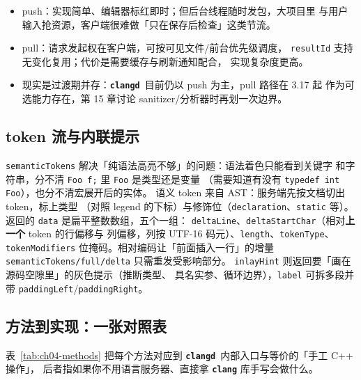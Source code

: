 \documentclass[12pt,a4paper,fontset=fandol]{ctexbook}
\newcommand{\Bk}{\discretionary{}{}{}}
\newcommand{\Lib}[1]{\textbf{\texttt{#1}}}
\newcommand{\Lang}[1]{\textsf{#1}}
\newcommand{\CPP}{\Lang{C++}}
\newcommand{\CD}{\Lib{clangd}}
\begin{document}
\begin{compare}[title={push 与 pull 诊断的取舍}]
\begin{itemize}
  \item push：实现简单、编辑器标红即时；但后台线程随时发包，大项目里
        与用户输入抢资源，客户端很难做「只在保存后检查」这类节流。
  \item pull：请求发起权在客户端，可按可见文件/前台优先级调度，
        \texttt{resultId} 支持无变化复用；代价是需要缓存与刷新通知配合，
        实现复杂度更高。
  \item 现实是过渡期并存：\CD\ 目前仍以 push 为主，pull 路径在 3.17 起
        作为可选能力存在，第 15 章讨论 sanitizer/分析器时再划一次边界。
\end{itemize}
\end{compare}

\subsection{token 流与内联提示}
\texttt{semanticTokens} 解决「纯语法高亮不够」的问题：语法着色只能看到关键字
和字符串，分不清 \texttt{Foo f;} 里 \texttt{Foo} 是类型还是变量
（需要知道有没有 \texttt{typedef int Foo}），也分不清宏展开后的实体。
语义 token 来自 AST：服务端先按文档切出 token，标上类型
（对照 legend 的下标）与修饰位（\texttt{declaration}、\texttt{static} 等）。
返回的 \texttt{data} 是扁平整数数组，五个一组：
\texttt{deltaLine}、\texttt{deltaStartChar}（相对\textbf{上一个} token 的行偏移与
列偏移，列按 UTF-16 码元）、\texttt{length}、\texttt{tokenType}、
\texttt{tokenModifiers} 位掩码。相对编码让「前面插入一行」的增量
\texttt{semanticTokens/full/delta} 只需重发受影响部分。
\texttt{inlayHint} 则返回要「画在源码空隙里」的灰色提示（推断类型、
具名实参、循环边界），\texttt{label} 可拆多段并带
\texttt{paddingLeft}/{\Bk}\texttt{paddingRight}。

\subsection{方法到实现：一张对照表}
表~\ref{tab:ch04-methods} 把每个方法对应到 \CD\ 内部入口与等价的「手工 \CPP{} 操作」，
后者指如果你不用语言服务器、直接拿 \Lib{clang} 库手写会做什么。
\end{document}
